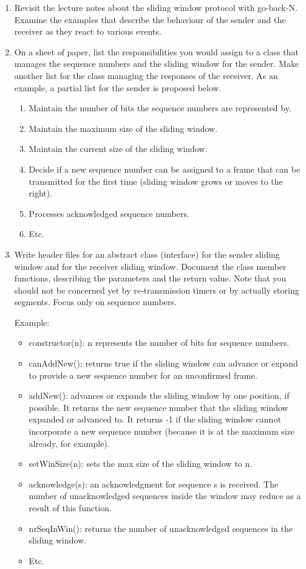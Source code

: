 \documentclass[12pt]{book}
\begin{document}
\begin{enumerate}[resume*]
\item Revisit the lecture notes about the sliding window protocol with go-back-N. Examine the examples that describe the behaviour of the sender and the receiver as they react to various events. 

\item On a sheet of paper, list the responsibilities you would assign to a class that manages the sequence numbers and the sliding window for the sender. Make another list for the class managing the responses of the receiver. As an example, a partial list for the sender is proposed below.

  \begin{enumerate}[label=R\arabic*.]
  \item Maintain the number of bits the sequence numbers are represented by.
  \item Maintain the maximum size of the sliding window.
  \item Maintain the current size of the sliding window.
  \item Decide if a new sequence number can be assigned to a frame that can be transmitted for the first time (sliding window grows or moves to the right).
  \item Processes acknowledged sequence numbers.
  \item Etc.
  \end{enumerate}

\item Write header files for an abstract class (interface) for the sender sliding window and for the receiver sliding window. Document the class member functions, describing the parameters and the return value. Note that you should not be concerned yet by re-transmission timers or by actually storing segments. Focus only on sequence numbers.

  Example:
  \begin{itemize}[label=--]
  \item constructor(n): n represents the number of bits for sequence numbers.
  \item canAddNew(): returns true if the sliding window can advance or expand to provide a new sequence number for an unconfirmed frame.
  \item addNew(): advances or expands the sliding window by one position, if possible. It returns the new sequence number that the sliding window expanded or advanced to. It returns -1 if the sliding window cannot incorporate a new sequence number (because it is at the maximum size already, for example).
  \item setWinSize(n): sets the max size of the sliding window to n.
  \item acknowledge(s): an acknowledgment for sequence s is received. The number of unacknowledged sequences inside the window may reduce as a result of this function.
  \item nrSeqInWin(): returns the number of unacknowledged sequences in the sliding window.
  \item Etc.
  \end{itemize}
\end{enumerate}
\end{document}
